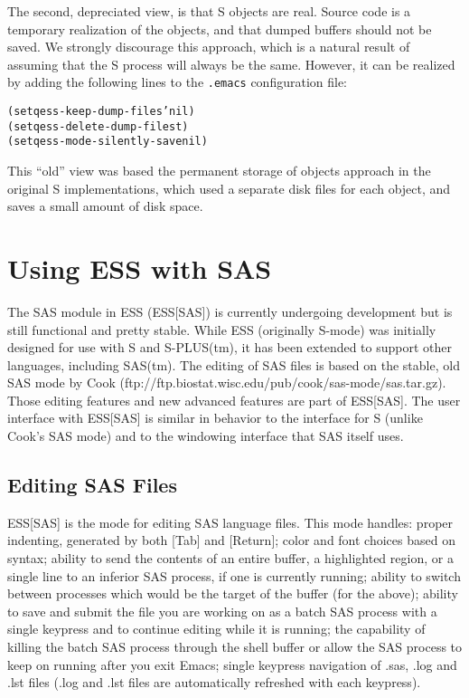 \documentclass{article}
\newenvironment{Salltt}{\small\begin{alltt}}{\end{alltt}}
\begin{document}
The second, depreciated view, is that S objects are real.  Source code
is a temporary realization of the objects, and that dumped buffers
should not be saved.  We strongly discourage this approach, which is a
natural result of assuming that the S process will always be the same.
However, it can be realized by adding the following lines to the
\texttt{.emacs} configuration file:
\begin{Salltt}
  (setq ess-keep-dump-files 'nil)
  (setq ess-delete-dump-files t)
  (setq ess-mode-silently-save nil)
\end{Salltt}
This ``old'' view was based the permanent storage of objects approach
in the original S implementations, which used a separate disk files
for each object, and saves a small amount of disk space.  


\section{Using ESS with SAS}
\label{sec:SAS}

The SAS module in ESS (ESS[SAS]) is currently undergoing development
but is still functional and pretty stable.  While ESS (originally
S-mode) was initially designed for use with S and S-PLUS(tm), it has
been extended to support other languages, including SAS(tm).  The
editing of SAS files is based on the stable, old SAS mode by Cook
(ftp://ftp.biostat.wisc.edu/pub/cook/sas-mode/sas.tar.gz).  Those
editing features and new advanced features are part of ESS[SAS].  The
user interface with ESS[SAS] is similar in behavior to the interface
for S (unlike Cook's SAS mode) and to the windowing interface that SAS
itself uses.

\subsection{Editing SAS Files}
\label{sec:SAS:edit}

ESS[SAS] is the mode for editing SAS language files.  This mode
handles: proper indenting, generated by both [Tab] and [Return]; color
and font choices based on syntax; ability to send the contents of an
entire buffer, a highlighted region, or a single line to an inferior
SAS process, if one is currently running; ability to switch between
processes which would be the target of the buffer (for the above);
ability to save and submit the file you are working on as a batch SAS
process with a single keypress and to continue editing while it is
running; the capability of killing the batch SAS process through the
shell buffer or allow the SAS process to keep on running after you
exit Emacs; single keypress navigation of .sas, .log and .lst files
(.log and .lst files are automatically refreshed with each keypress).
\end{document}
